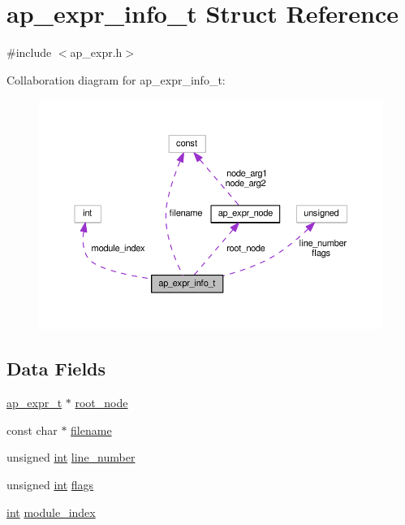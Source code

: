 \hypertarget{structap__expr__info__t}{}\section{ap\+\_\+expr\+\_\+info\+\_\+t Struct Reference}
\label{structap__expr__info__t}


{\ttfamily \#include $<$ap\+\_\+expr.\+h$>$}



Collaboration diagram for ap\+\_\+expr\+\_\+info\+\_\+t\+:
\nopagebreak
\begin{figure}[H]
\begin{center}
\leavevmode
\includegraphics[width=350pt]{structap__expr__info__t__coll__graph}
\end{center}
\end{figure}
\subsection*{Data Fields}
\begin{DoxyCompactItemize}
\item 
\hyperlink{group__AP__EXPR_ga1495a85c3a89e64cf625dfe1a5905fcb}{ap\+\_\+expr\+\_\+t} $\ast$ \hyperlink{structap__expr__info__t_ab065d67efef6635b3e55ace63c1983ef}{root\+\_\+node}
\item 
const char $\ast$ \hyperlink{structap__expr__info__t_aef6debc56a84a98cf8e971af5ed2c6e5}{filename}
\item 
unsigned \hyperlink{pcre_8txt_a42dfa4ff673c82d8efe7144098fbc198}{int} \hyperlink{structap__expr__info__t_a31130ccb91b53db455b664353691e7b9}{line\+\_\+number}
\item 
unsigned \hyperlink{pcre_8txt_a42dfa4ff673c82d8efe7144098fbc198}{int} \hyperlink{structap__expr__info__t_a3975379515d9232a69b4f8cc7590e89a}{flags}
\item 
\hyperlink{pcre_8txt_a42dfa4ff673c82d8efe7144098fbc198}{int} \hyperlink{structap__expr__info__t_a89b1c21768ddb41dc38295388e82410a}{module\+\_\+index}
\end{DoxyCompactItemize}


